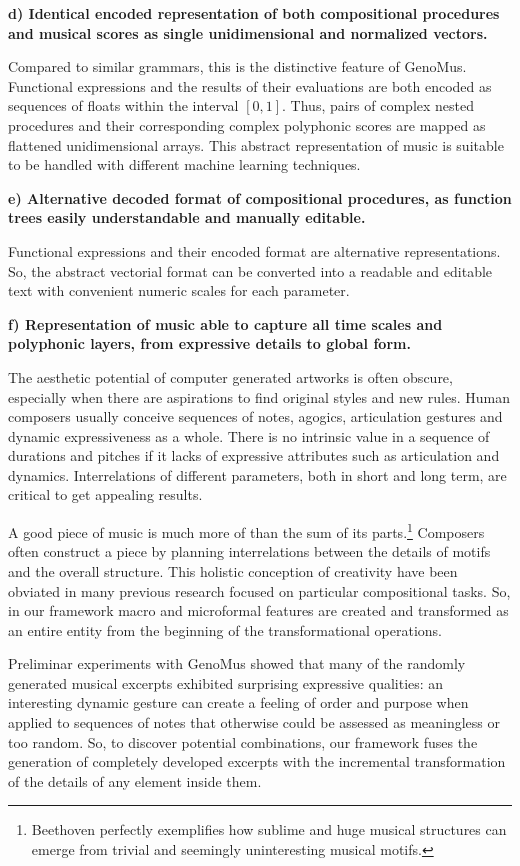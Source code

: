 \documentclass{article}
\begin{document}
\textbf{d) Identical encoded representation of both compositional procedures and musical scores as single unidimensional and normalized vectors.}

Compared to similar grammars, this is the distinctive feature of GenoMus. Functional expressions and the results of their evaluations are both encoded as sequences of floats within the interval $[0, 1]$. Thus, pairs of complex nested procedures and their corresponding complex polyphonic scores are mapped as flattened unidimensional arrays. This abstract representation of music is suitable to be handled with different machine learning techniques. 

\textbf{e) Alternative decoded format of compositional procedures, as function trees easily understandable and manually editable.}

Functional expressions and their encoded format are alternative representations. So, the abstract vectorial format can be converted into a readable and editable text with convenient numeric scales for each parameter.

\textbf{f) Representation of music able to capture all time scales and polyphonic layers, from expressive details to global form.} 

The aesthetic potential of computer generated artworks is often obscure, especially when there are aspirations to find original styles and new rules. Human composers usually conceive sequences of notes, agogics, articulation gestures and dynamic expressiveness as a whole. There is no intrinsic value in a sequence of durations and pitches if it lacks of expressive attributes such as articulation and dynamics. Interrelations of different parameters, both in short and long term, are critical to get appealing results.

A good piece of music is much more of than the sum of its parts.\footnote{Beethoven perfectly exemplifies how sublime and huge musical structures can emerge from trivial and seemingly uninteresting musical motifs.} Composers often construct a piece by planning interrelations between the details of motifs and the overall structure. This holistic conception of creativity have been obviated in many previous research focused on particular compositional tasks. So, in our framework macro and microformal features are created and transformed as an entire entity from the beginning of the transformational operations.

Preliminar experiments with GenoMus showed that many of the randomly generated musical excerpts exhibited surprising expressive qualities: an interesting dynamic gesture can create a feeling of order and purpose when applied to sequences of notes that otherwise could be assessed as meaningless or too random. So, to discover potential combinations, our framework fuses the generation of completely developed excerpts with the incremental transformation of the details of any element inside them.
\end{document}
